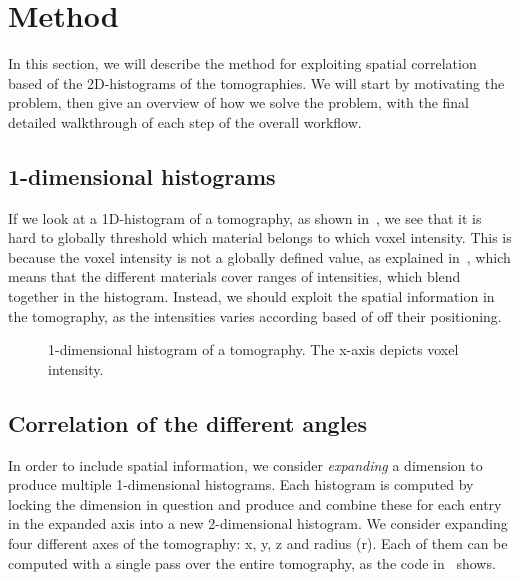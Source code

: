 \section{Method}\label{sec:method}
In this section, we will describe the method for exploiting spatial correlation based of the 2D-histograms of the tomographies.
We will start by motivating the problem, then give an overview of how we solve the problem, with the final detailed walkthrough of each step of the overall workflow.

\subsection{1-dimensional histograms}
If we look at a 1D-histogram of a tomography, as shown in~, we see that it is hard to globally threshold which material belongs to which voxel intensity.
This is because the voxel intensity is not a globally defined value, as explained in~, which means that the different materials cover ranges of intensities, which blend together in the histogram.
Instead, we should exploit the spatial information in the tomography, as the intensities varies according based of off their positioning.

\begin{figure}
    \centering
    \caption{1-dimensional histogram of a tomography. The x-axis depicts voxel intensity.}
    \label{fig:1d-hist}
\end{figure}

\subsection{Correlation of the different angles}
In order to include spatial information, we consider \emph{expanding} a dimension to produce multiple 1-dimensional histograms.
Each histogram is computed by locking the dimension in question and produce
and combine these for each entry in the expanded axis into a new 2-dimensional histogram.
We consider expanding four different axes of the tomography: x, y, z and radius (r).
Each of them can be computed with a single pass over the entire tomography, as the code in~ shows.


